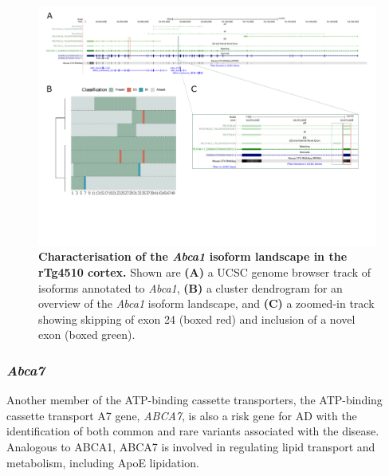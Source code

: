 \begin{landscape}
	\begin{figure}[htp]
		\centering
		\includegraphics[page=1,trim={0 4cm 0 0},scale = 0.85]{Figures/TargetGenes_Annotation_Landscape.pdf}
		\captionsetup{width=1.3\textwidth}
		\caption[Characterisation of the \textit{Abca1} isoform landscape in the rTg4510 mouse cortex]%
		{\textbf{Characterisation of the \textit{Abca1} isoform landscape in the rTg4510 cortex.} Shown are \textbf{(A)} a UCSC genome browser track of isoforms annotated to \textit{Abca1}, \textbf{(B)} a cluster dendrogram for an overview of the \textit{Abca1} isoform landscape, and \textbf{(C)} a zoomed-in track showing skipping of exon 24 (boxed red) and inclusion of a novel exon (boxed green).}   
		\label{fig:abca1}
	\end{figure}
\end{landscape}
\restoregeometry

\newpage
\subsubsection{\textit{Abca7}}
Another member of the ATP-binding cassette transporters, the ATP-binding cassette transport A7 gene, \textit{ABCA7}, is also a risk gene for AD with the identification of both common and rare variants associated with the disease\cite{Steinberg2015,Cuyvers2015,Guennec2016}. Analogous to ABCA1, ABCA7 is involved in regulating lipid transport and metabolism, including ApoE lipidation\cite{DeRoeck2019a}. 

